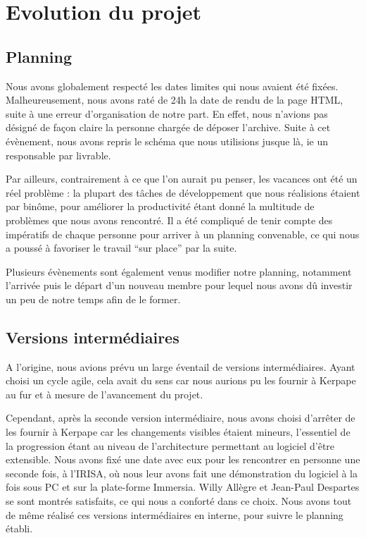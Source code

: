 \section{Evolution du projet}
\subsection{Planning}
Nous avons globalement respecté les dates limites qui nous avaient été fixées.
Malheureusement, nous avons raté de 24h la date de rendu de la page HTML, suite à une erreur d'organisation de notre part.
En effet, nous n'avions pas désigné de façon claire la personne chargée de déposer l'archive.
Suite à cet évènement, nous avons repris le schéma que nous utilisions jusque là, ie un responsable par livrable.

Par ailleurs, contrairement à ce que l'on aurait pu penser, les vacances ont été un réel problème : la plupart des tâches
de développement que nous réalisions étaient par binôme, pour améliorer la productivité étant donné la multitude
de problèmes que nous avons rencontré. Il a été compliqué de tenir compte des impératifs de chaque personne
pour arriver à un planning convenable, ce qui nous a poussé à favoriser le travail \enquote{sur place} par la suite.

Plusieurs évènements sont également venus modifier notre planning, notamment l'arrivée puis le départ d'un nouveau membre
pour lequel nous avons dû investir un peu de notre temps afin de le former.

\subsection{Versions intermédiaires}
A l'origine, nous avions prévu un large éventail de versions intermédiaires. Ayant choisi un cycle agile, cela avait du
sens car nous aurions pu les fournir à Kerpape au fur et à mesure de l'avancement du projet.

Cependant, après la seconde version intermédiaire, nous avons choisi d'arrêter de les fournir à Kerpape car les changements
visibles étaient mineurs, l'essentiel de la progression étant au niveau de l'architecture permettant au logiciel d'être
extensible. Nous avons fixé une date avec eux pour les rencontrer en personne une seconde fois, à l'IRISA, où nous
leur avons fait une démonstration du logiciel à la fois sous PC et sur la plate-forme Immersia. Willy Allègre et Jean-Paul
Despartes se sont montrés satisfaits, ce qui nous a conforté dans ce choix. Nous avons tout de même réalisé ces
versions intermédiaires en interne, pour suivre le planning établi.

